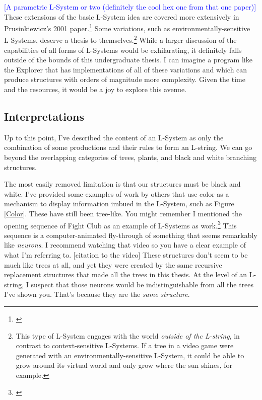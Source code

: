 \documentclass[12pt,twoside]{reedthesis}
\begin{document}
	\textcolor{blue}{[A parametric L-System or two (definitely the cool hex one from that one paper)]}\\
	
	These extensions of the basic L-System idea are covered more extensively in Prusinkiewicz's 2001 paper.\footnote{\cite{LSystems2001}} Some variations, such as environmentally-sensitive L-Systems, deserve a thesis to themselves.\footnote{This type of L-System engages with the world \textit{outside of the L-string}, in contrast to context-sensitive L-Systems. If a tree in a video game were generated with an environmentally-sensitive L-System, it could be able to grow around its virtual world and only grow where the sun shines, for example.} While a larger discussion of the capabilities of all forms of L-Systems would be exhilarating, it definitely falls outside of the bounds of this undergraduate thesis. I can imagine a program like the Explorer that has implementations of all of these variations and which can produce structures with orders of magnitude more complexity. Given the time and the resources, it would be a joy to explore this avenue.
	
	\subsection{Interpretations}
	\label{Interpretations}
	
	Up to this point, I've described the content of an L-System as only the combination of some productions and their rules to form an L-string. We can go beyond the overlapping categories of trees, plants, and black and white branching structures.
	
	The most easily removed limitation is that our structures must be black and white. I've provided some examples of work by others that use color as a mechanism to display information imbued in the L-System, such as Figure \ref{Color}. These have still been tree-like. You might remember I mentioned the opening sequence of Fight Club as an example of L-Systems as work.\footnote{\cite{FightClubVid}} This sequence is a computer-animated fly-through of something that seems remarkably like \textit{neurons}. I recommend watching that video so you have a clear example of what I'm referring to. [citation to the video] These structures don't seem to be much like trees at all, and yet they were created by the same recursive replacement structures that made all the trees in this thesis. At the level of an L-string, I suspect that those neurons would be indistinguishable from all the trees I've shown you. That's because they are the \textit{same structure}.\\
	
\end{document}
